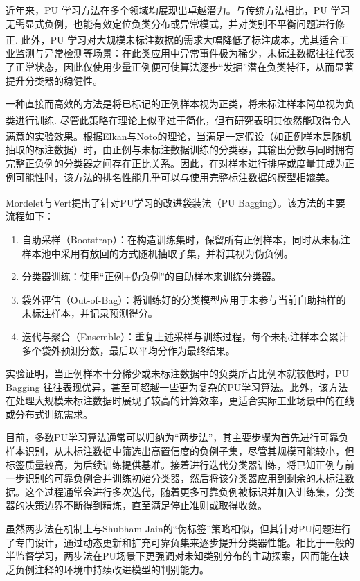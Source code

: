 近年来，PU 学习方法在多个领域均展现出卓越潜力。与传统方法相比，PU 学习无需显式负例，也能有效定位负类分布或异常模式，并对类别不平衡问题进行修正\textsuperscript{\cite{elkan2008learning}}. 此外，PU 学习对大规模未标注数据的需求大幅降低了标注成本，尤其适合工业监测与异常检测等场景：在此类应用中异常事件极为稀少，未标注数据往往代表了正常状态，因此仅使用少量正例便可使算法逐步“发掘”潜在负类特征，从而显著提升分类器的稳健性。

一种直接而高效的方法是将已标记的正例样本视为正类，将未标注样本简单视为负类进行训练\textsuperscript{\cite{elkan2008learning}}. 尽管此策略在理论上似乎过于简化，但有研究表明其依然能取得令人满意的实验效果。根据Elkan与Noto\textsuperscript{\cite{elkan2008learning}}的理论，当满足一定假设（如正例样本是随机抽取的标注数据）时，由正例与未标注数据训练的分类器，其输出分数与同时拥有完整正负例的分类器之间存在正比关系。因此，在对样本进行排序或度量其成为正例可能性时，该方法的排名性能几乎可以与使用完整标注数据的模型相媲美。

Mordelet与Vert\textsuperscript{\cite{mordelet2013bagging}}提出了针对PU学习的改进袋装法（PU Bagging）。该方法的主要流程如下：
\begin{enumerate}
	\item 自助采样（Bootstrap）：在构造训练集时，保留所有正例样本，同时从未标注样本池中采用有放回的方式随机抽取子集，并将其视为伪负例。
	\item 分类器训练：使用“正例+伪负例”的自助样本来训练分类器。
	\item 袋外评估（Out-of-Bag）：将训练好的分类模型应用于未参与当前自助抽样的未标注样本，并记录预测得分。
	\item 迭代与聚合（Ensemble）：重复上述采样与训练过程，每个未标注样本会累计多个袋外预测分数，最后以平均分作为最终结果。
\end{enumerate}

实验证明，当正例样本十分稀少或未标注数据中的负类所占比例本就较低时，PU Bagging 往往表现优异，甚至可超越一些更为复杂的PU学习算法。此外，该方法在处理大规模未标注数据时展现了较高的计算效率，更适合实际工业场景中的在线或分布式训练需求。

目前，多数PU学习算法通常可以归纳为“两步法”，其主要步骤为首先进行可靠负样本识别，从未标注数据中筛选出高置信度的负例子集，尽管其规模可能较小，但标签质量较高，为后续训练提供基准。接着进行迭代分类器训练，将已知正例与前一步识别的可靠负例合并训练初始分类器，然后将该分类器应用到剩余的未标注数据。这个过程通常会进行多次迭代，随着更多可靠负例被标识并加入训练集，分类器的决策边界不断得到精炼，直至满足停止准则或取得收敛。

虽然两步法在机制上与Shubham Jain的“伪标签”策略相似，但其针对PU问题进行了专门设计，通过动态更新和扩充可靠负集来逐步提升分类器性能。相比于一般的半监督学习，两步法在PU场景下更强调对未知类别分布的主动探索，因而能在缺乏负例注释的环境中持续改进模型的判别能力。

